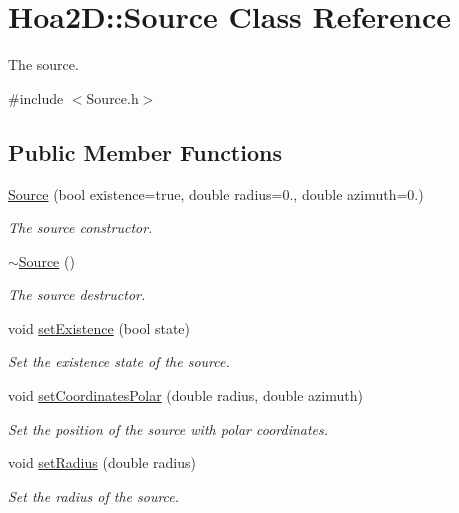 \hypertarget{class_hoa2_d_1_1_source}{\section{Hoa2\-D\-:\-:Source Class Reference}
\label{class_hoa2_d_1_1_source}
}


The source.  




{\ttfamily \#include $<$Source.\-h$>$}

\subsection*{Public Member Functions}
\begin{DoxyCompactItemize}
\item 
\hyperlink{class_hoa2_d_1_1_source_a198b056a021f3b885e9d70f5802abfac}{Source} (bool existence=true, double radius=0., double azimuth=0.)
\begin{DoxyCompactList}\small\item\em The source constructor. \end{DoxyCompactList}\item 
\hyperlink{class_hoa2_d_1_1_source_ae5d9130e101151dbceb0a23f9df62807}{$\sim$\-Source} ()
\begin{DoxyCompactList}\small\item\em The source destructor. \end{DoxyCompactList}\item 
void \hyperlink{class_hoa2_d_1_1_source_a1ccb8d392b049df8308bd9c0b3639764}{set\-Existence} (bool state)
\begin{DoxyCompactList}\small\item\em Set the existence state of the source. \end{DoxyCompactList}\item 
void \hyperlink{class_hoa2_d_1_1_source_a663a68879c3fb11941048b3584fa4189}{set\-Coordinates\-Polar} (double radius, double azimuth)
\begin{DoxyCompactList}\small\item\em Set the position of the source with polar coordinates. \end{DoxyCompactList}\item 
void \hyperlink{class_hoa2_d_1_1_source_a78bdd84f1836063ffd9982b40bff20ba}{set\-Radius} (double radius)
\begin{DoxyCompactList}\small\item\em Set the radius of the source. \end{DoxyCompactList}\item 

\end{DoxyCompactItemize}
